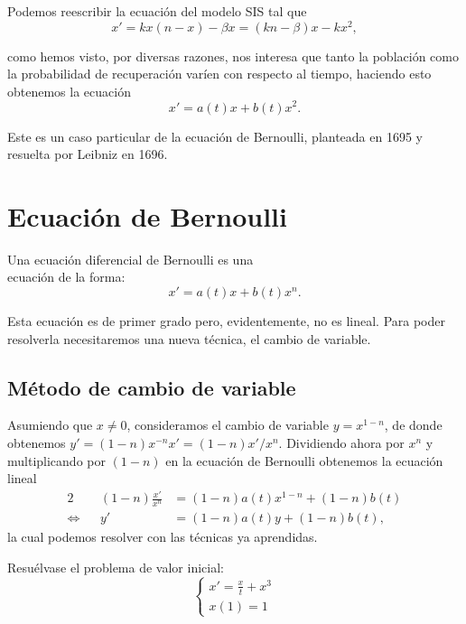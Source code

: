 \documentclass[../ecuaciones_diferenciales.tex]{subfiles}
\begin{document}
Podemos reescribir la ecuación del modelo SIS tal que
\[x' = k x(n - x) - \beta x = (kn - \beta)x - kx^2,\]

como hemos visto, por diversas razones, nos interesa que tanto la población como
la probabilidad de recuperación varíen con respecto al tiempo, haciendo esto
obtenemos la ecuación
\[x' = a(t)x + b(t)x^2.\]

Este es un caso particular de la ecuación de Bernoulli, planteada en 1695 y
resuelta por Leibniz en 1696.

\section{Ecuación de Bernoulli}

\begin{definition}
	Una ecuación diferencial de Bernoulli es una \\ %
	ecuación de la forma:
	\[x' = a(t)x + b(t)x^n.\]
\end{definition}

Esta ecuación es de primer grado pero, evidentemente, no es lineal. Para poder
resolverla necesitaremos una nueva técnica, el cambio de variable.

\subsection{Método de cambio de variable}

Asumiendo que \(x \neq 0\), consideramos el cambio de variable
\(y = x^{1 - n}\), de donde obtenemos
\(y' = (1 - n) x^{-n} x' = (1 - n)x'/x^n\). Dividiendo ahora por \(x^n\) y
multiplicando por \((1 - n)\) en la ecuación de Bernoulli obtenemos la ecuación
lineal
\begin{alignat*}{2}
	     &  & (1 - n)\frac{x'}{x^n} & = (1-n)a(t)x^{1-n} + (1-n)b(t) \\
	\iff &  & y'                    & = (1 - n)a(t)y + (1 - n)b(t),
\end{alignat*}
la cual podemos resolver con las técnicas ya aprendidas.

\begin{example}
	\label{ex:cambio_var}
	Resuélvase el problema de valor inicial:
	\[\begin{cases}
			x' = \frac{x}{t} + x^3 \\
			x(1) = 1
		\end{cases}\]
\end{example}
\end{document}

